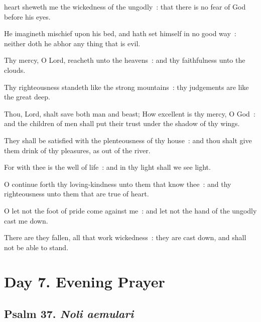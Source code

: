  heart sheweth me the wickedness of the ungodly~: that there is no fear of God before his eyes.\par
{}
He imagineth mischief upon his bed, and hath set himself in no good way~: neither doth he abhor any thing that is evil.\par
{}Thy mercy, O Lord, reacheth unto the heavens~: and thy faithfulness unto the clouds.\par
{}Thy righteousness standeth like the strong mountains~: thy judgements are like the great deep.\par
{}Thou, Lord, shalt save both man and beast; How excellent is thy mercy, O God~: and the children of men shall put their trust under the shadow of thy wings.\par
{}They shall be satisfied with the plenteousness of thy house~: and thou shalt give them drink of thy pleasures, as out of the river.\par
{}For with thee is the well of life~: and in thy light shall we see light.\par
{}O continue forth thy loving-kindness unto them that know thee~: and thy righteousness unto them that are true of heart.\par
{}O let not the foot of pride come against me~: and let not the hand of the ungodly cast me down.\par
{}There are they fallen, all that work wickedness~: they are cast down, and shall not be able to stand.\par


\section*{Day 7. Evening Prayer}

\subsection{Psalm 37. \textit{Noli aemulari}}


